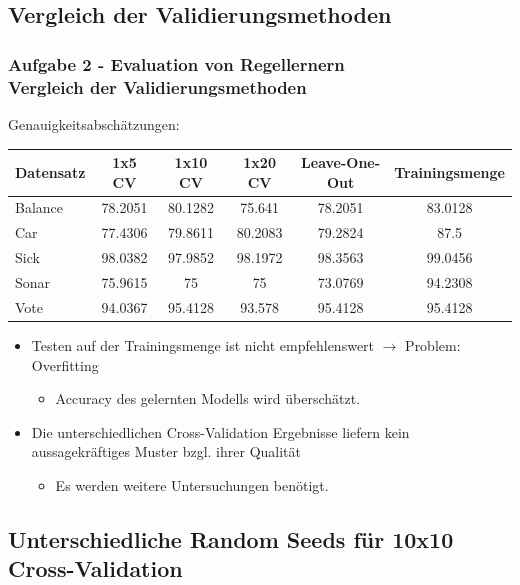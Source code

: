 \documentclass[accentcolor=tud6b,colorbacktitle,inverttitle,landscape,german,presentation,t]{tudbeamer}
\begin{document}
    \subsection{Vergleich der Validierungsmethoden}
    
    \begin{frame}[t]
    \frametitle{Aufgabe 2 - Evaluation von Regellernern\\ Vergleich der Validierungsmethoden}
        \vfill        
        Genauigkeitsabschätzungen: \\
        \vfill
        \begin{tabular}[htbp]{l||c|c|c|c|c}
            Datensatz & 1x5 CV & 1x10 CV & 1x20 CV & Leave-One-Out & Trainingsmenge \\
            \hline
            \hline
            Balance & 78.2051 & 80.1282 & 75.641 & 78.2051 & 83.0128 \\
            \hline
            Car & 77.4306 & 79.8611 & 80.2083 & 79.2824 & 87.5 \\
            \hline
            Sick & 98.0382 & 97.9852 & 98.1972 & 98.3563 & 99.0456 \\
            \hline
            Sonar & 75.9615 & 75 & 75 & 73.0769 & 94.2308 \\
            \hline
            Vote & 94.0367 & 95.4128 & 93.578 & 95.4128 & 95.4128 \\
        \end{tabular}
        \vfill
        \begin{itemize}
            \item Testen auf der Trainingsmenge ist nicht empfehlenswert $\rightarrow$ Problem: Overfitting
             \begin{itemize}
         		\item Accuracy des gelernten Modells wird überschätzt.
	 \end{itemize}	
            \item Die unterschiedlichen Cross-Validation Ergebnisse liefern kein aussagekräftiges Muster bzgl. ihrer Qualität
               \begin{itemize}
         		\item Es werden weitere Untersuchungen benötigt.
	 \end{itemize} 
        \end{itemize}
    \end{frame}
    
    \subsection{Unterschiedliche Random Seeds für 10x10 Cross-Validation}
    
\end{document}

